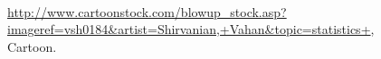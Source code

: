 \documentclass[12pt,letterpaper,final]{article}\usepackage[]{graphicx}\usepackage[]{color}
\begin{document}
\setcounter{page}{1}




\vspace*{1cm}

~\\[1cm]

\begin{figure}[ht]
\caption{\label{Cartoonstock_FallingArrow}
\url{http://www.cartoonstock.com/blowup_stock.asp?imageref=vsh0184&artist=Shirvanian,+Vahan&topic=statistics+}, 
Cartoon.
}
\end{figure}
\end{document}

